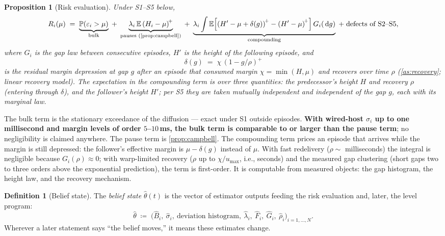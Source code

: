 \documentclass[11pt, a4paper]{article}
\theoremstyle{definition}
\newtheorem{definition}{Definition}[section]
\theoremstyle{plain}
\newtheorem{proposition}[theorem]{Proposition}
\theoremstyle{remark}
\newcommand{\E}{\mathbb{E}}
\newcommand{\Prob}{\mathbb{P}}
\newcommand{\dd}{\,\mathrm{d}}
\newcommand{\pos}[1]{\left(#1\right)^{\!+}}
\begin{document}
\begin{proposition}[Risk evaluation]\label{prop:risk-evaluation}
Under S1--S5 below,
\begin{equation}\label{eq:risk-evaluation}
  R_i(\mu)
  \;=\;
  \underbrace{\Prob(\varepsilon_i > \mu)}_{\text{bulk}}
  \;+\;
  \underbrace{\lambda_i\,\E\pos{H_i - \mu}}_{\text{pauses
  (\cref{prop:campbell})}}
  \;+\;
  \underbrace{\lambda_i \int \E\Bigl[\pos{H' - \mu + \delta(g)}
      - \pos{H' - \mu}\Bigr]\, G_i(\dd g)}_{\text{compounding}}
  \;+\; \text{defects of S2--S5},
\end{equation}
where $G_i$ is the gap law between consecutive episodes, $H'$ is the
height of the following episode, and
\begin{equation}\label{eq:depression}
  \delta(g) \;=\; \chi\,\pos{1 - g/\rho}
\end{equation}
is the residual margin depression at gap $g$ after an episode that
consumed margin $\chi = \min(H, \mu)$ and recovers over time $\rho$
(\cref{as:recovery}; linear recovery model).  The expectation in the
compounding term is over three quantities: the predecessor's height
$H$ and recovery $\rho$ (entering through $\delta$), and the
follower's height $H'$; per S5 they are taken mutually independent
and independent of the gap $g$, each with its marginal law.
\end{proposition}

The bulk term is the stationary exceedance of the diffusion --- exact
under S1 outside episodes.  \textbf{With wired-host $\sigma_i$ up to one
millisecond and margin levels of order $5$--$10$\,ms, the bulk term is
comparable to or larger than the pause term}; no negligibility is
claimed anywhere.  The pause term is \cref{prop:campbell}.  The
compounding term prices an episode that arrives while the margin is
still depressed: the follower's effective margin is
$\mu - \delta(g)$ instead of $\mu$.  With fast redelivery
($\rho \sim$ milliseconds) the integral is negligible because
$G_i(\rho) \approx 0$; with warp-limited recovery
($\rho$ up to $\chi/u_{\max}$, i.e., seconds) and the measured gap
clustering (short gaps two to three orders above the exponential
prediction), the term is first-order.  It is computable from measured
objects: the gap histogram, the height law, and the recovery mechanism.

\begin{definition}[Belief state]\label{def:belief}
The \emph{belief state} $\hat\theta(t)$ is the vector of estimator
outputs feeding the risk evaluation and, later, the level program:
\[
  \hat\theta \;\coloneqq\;
  \bigl(\hat B_i,\ \hat\sigma_i,\
  \text{deviation histogram},\
  \hat\lambda_i,\ \hat F_i,\ \hat G_i,\ \hat\rho_i
  \bigr)_{i=1,\dots,N}.
\]
Wherever a later statement says ``the belief moves,'' it means these
estimates change.
\end{definition}
\end{document}
